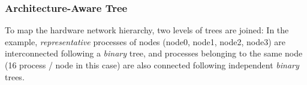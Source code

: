 \begin{frame}[fragile]
  \frametitle{Architecture-Aware Tree}

  \begin{center}
    \resizebox{\linewidth}{!}{\begin{tikzpicture}[>=latex',scale=.25]
        
      \end{tikzpicture}}
  \end{center}
  To map the hardware network hierarchy, two levels of trees are
  joined: In the example, \emph{representative} processes of nodes
  (\textcolor{red!20}{node0}, \textcolor{green!20}{node1},
  \textcolor{purple!20}{node2}, \textcolor{violet!20}{node3}) are
  interconnected following a \emph{binary} tree, and processes
  belonging to the same node (16 process / node in this case) are also
  connected following independent \emph{binary} trees.
\end{frame}

